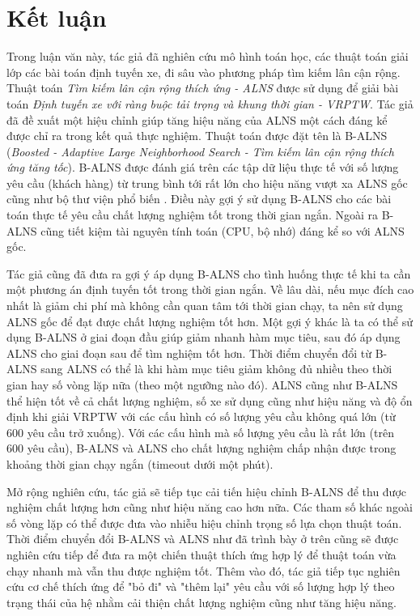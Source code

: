 \chapter{Kết luận}
\label{chap:conclusion}

Trong luận văn này, tác giả đã nghiên cứu mô hình toán học, các thuật toán giải lớp các bài toán định tuyến xe, đi sâu vào phương pháp tìm kiếm lân cận rộng. Thuật toán \textit{Tìm kiếm lân cận rộng thích ứng - ALNS} được sử dụng để giải bài toán \textit{Định tuyến xe với ràng buộc tải trọng và khung thời gian - VRPTW}. Tác giả đã đề xuất một hiệu chỉnh giúp tăng hiệu năng của ALNS một cách đáng kể được chỉ ra trong kết quả thực nghiệm. Thuật toán được đặt tên là B-ALNS (\textit{Boosted - Adaptive Large Neighborhood Search - Tìm kiếm lân cận rộng thích ứng tăng tốc}). B-ALNS được đánh giá trên các tập dữ liệu thực tế với số lượng yêu cầu (khách hàng) từ trung bình tới rất lớn cho hiệu năng vượt xa ALNS gốc cũng như bộ thư viện phổ biến . Điều này gợi ý sử dụng B-ALNS cho các bài toán thực tế yêu cầu chất lượng nghiệm tốt trong thời gian ngắn. Ngoài ra B-ALNS cũng tiết kiệm tài nguyên tính toán (CPU, bộ nhớ) đáng kể so với ALNS gốc.

Tác giả cũng đã đưa ra gợi ý áp dụng B-ALNS cho tình huống thực tế khi ta cần một phương án định tuyến tốt trong thời gian ngắn. Về lâu dài, nếu mục đích cao nhất là giảm chi phí mà không cần quan tâm tới thời gian chạy, ta nên sử dụng ALNS gốc để đạt được chất lượng nghiệm tốt hơn. Một gợi ý khác là ta có thể sử dụng B-ALNS ở giai đoạn đầu giúp giảm nhanh hàm mục tiêu, sau đó áp dụng ALNS cho giai đoạn sau để tìm nghiệm tốt hơn. Thời điểm chuyển đổi từ B-ALNS sang ALNS có thể là khi hàm mục tiêu giảm không đủ nhiều theo thời gian hay số vòng lặp nữa (theo một ngưỡng nào đó). ALNS cũng như B-ALNS thể hiện tốt về cả chất lượng nghiệm, số xe sử dụng cũng như hiệu năng và độ ổn định khi giải VRPTW với các cấu hình có số lượng yêu cầu không quá lớn (từ $600$ yêu cầu trở xuống). Với các cấu hình mà số lượng yêu cầu là rất lớn (trên $600$ yêu cầu), B-ALNS và ALNS cho chất lượng nghiệm chấp nhận được trong khoảng thời gian chạy ngắn (timeout dưới một phút).

Mở rộng nghiên cứu, tác giả sẽ tiếp tục cải tiến hiệu chỉnh B-ALNS để thu được nghiệm chất lượng hơn cũng như hiệu năng cao hơn nữa. Các tham số khác ngoài số vòng lặp có thể được đưa vào nhiễu hiệu chỉnh trọng số lựa chọn thuật toán. Thời điểm chuyển đổi B-ALNS và ALNS như đã trình bày ở trên cũng sẽ được nghiên cứu tiếp để đưa ra một chiến thuật thích ứng hợp lý để thuật toán vừa chạy nhanh mà vẫn thu được nghiệm tốt. Thêm vào đó, tác giả tiếp tục nghiên cứu cơ chế thích ứng để "bỏ đi" và "thêm lại" yêu cầu với số lượng hợp lý theo trạng thái của hệ nhằm cải thiện chất lượng nghiệm cũng như tăng hiệu năng.

